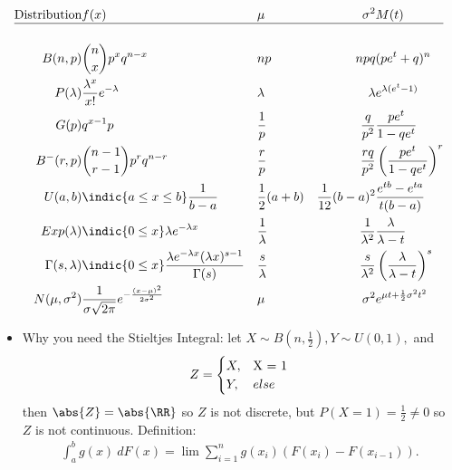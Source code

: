 \begin{align*}
\text{Distribution} & f(x)                                                                            &  & \mu              & \sigma^2            & M(t) \\
\hline \\
B(n, p)             & {n\choose x}p^x q^{n-x}                                                         &  & np               & npq                 & (pe^t + q)^n
\\
P(\lambda)          & \frac{\lambda^x}{x!}e^{-\lambda}                                                &  & \lambda          & \lambda             & e^{\lambda(e^t-1)}
\\
G(p)                & q^{x-1}p                                                                        &  & \frac{1}{p}      & \frac{q}{p^2}       & \frac{pe^t}{1-qe^t}
\\
B^-(r, p)           & {n-1 \choose r-1}p^rq^{n-r}                                                     &  & \frac{r}{p}      & \frac{rq}{p^2}      & \left(\frac{pe^t}{1-qe^t}\right)^r
\\
U(a, b)             & \indic{a\leq x\leq b}\frac 1 {b-a}                                          &  & \frac{1}{2}(a+b) & \frac{1}{12}(b-a)^2 & \frac{e^{tb} - e^{ta}}{t(b-a)}
\\
Exp(\lambda)        & \indic{0 \leq x}\lambda e^{-\lambda x}                                      &  & \frac 1 \lambda  & \frac 1 {\lambda^2} & \frac \lambda {\lambda - t}
\\
\Gamma(s, \lambda)  & \indic{0 \leq x} \frac{\lambda e^{-\lambda x} (\lambda x)^{s-1}}{\Gamma(s)} &  & \frac s \lambda  & \frac s {\lambda^2} & \left( \frac{\lambda}{\lambda - t} \right)^s \\
N(\mu, \sigma^2)    & \frac{1}{\sigma \sqrt{2\pi}}e^{-\frac{(x-\mu)^2}{2\sigma^2}}                    &  & \mu              & \sigma^2            & e^{\mu t + \frac{1}{2}\sigma^2 t^2}
\end{align*}

\begin{itemize}
\tightlist
\item
  Why you need the Stieltjes Integral: let
  \(X \sim B(n, \frac 1 2), Y \sim U(0, 1),\) and
  \begin{align*}
  Z = 
  \begin{cases}
  X, & $X = 1$ \\
  Y, & else
  \end{cases}
  \end{align*} then \(\abs{Z} = \abs{\RR}\) so \(Z\) is not discrete,
  but \(P(X = 1) = \frac 1 2 \neq 0\) so \(Z\) is not continuous.
  Definition:
  \begin{align*}  
  \int _ { a } ^ { b } g ( x ) ~d F ( x ) = \lim \sum _ { i = 1 } ^ { n } g \left( x _ { i } \right) \left( F \left( x _ { i } \right) - F \left( x _ { i - 1 } \right) \right)
  .\end{align*}
\end{itemize}

